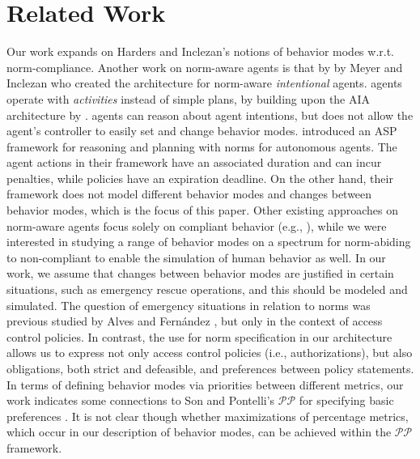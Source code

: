 \section{Related Work}
\label{sec:related}

Our work expands on Harders and Inclezan's \cite{hi23} notions of behavior modes w.r.t. norm-compliance. Another work on norm-aware agents is that by by Meyer and Inclezan \cite{mi21} who created the \apia architecture for norm-aware {\em intentional} agents. \apia agents operate with {\em activities} instead of simple plans, by building upon the AIA architecture by \cite{BlountGB15}. %
\apia agents can reason about agent intentions, %
but does not allow the agent's controller to easily set and change behavior modes. %
\cite{ShamsVPV17} introduced an ASP framework for reasoning and planning with norms for autonomous agents. The agent actions in their framework have an associated duration and can incur penalties, while policies have an expiration deadline. On the other hand, their framework does not model different behavior modes and changes between behavior modes, which is the focus of this paper. Other existing approaches on norm-aware agents focus solely on compliant behavior (e.g., \cite{Oren11,Alechina12}), while we were interested in studying a range of behavior modes on a spectrum for norm-abiding to non-compliant to enable the simulation of human behavior as well.
%
In our work, we assume that changes between behavior modes are justified in certain situations, such as emergency rescue operations, and this should be modeled and simulated. The question of emergency situations in relation to norms was previous studied by Alves and Fernández \cite{af17}, but only in the context of access control policies. In contrast, the use \aopl for norm specification in our architecture allows us to express not only access control policies (i.e., authorizations), but also obligations, both strict and defeasible, and preferences between policy statements.
%
In terms of defining behavior modes via priorities between different metrics, our work indicates some connections to Son and Pontelli's $\mathscr{PP}$ for specifying basic preferences \cite{son_pontelli_2006}. It is not clear though whether maximizations of percentage metrics, which occur in our description of behavior modes, can be achieved within the $\mathscr{PP}$ framework.

